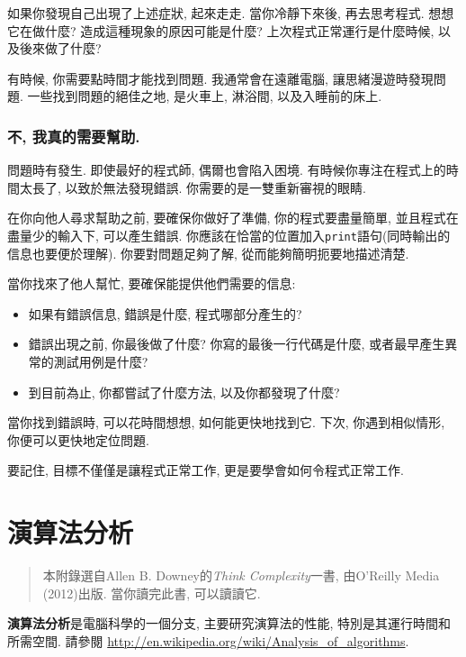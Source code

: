 \documentclass[10pt]{book}
\begin{document}
如果你發現自己出現了上述症狀, 起來走走. 
當你冷靜下來後, 再去思考程式. 
想想它在做什麼? 造成這種現象的原因可能是什麼?
上次程式正常運行是什麼時候, 以及後來做了什麼?

有時候, 你需要點時間才能找到問題. 
我通常會在遠離電腦, 讓思緒漫遊時發現問題. 
一些找到問題的絕佳之地, 是火車上, 淋浴間, 以及入睡前的床上. 


\subsection{不, 我真的需要幫助.}

問題時有發生. 即使最好的程式師, 偶爾也會陷入困境. 
有時候你專注在程式上的時間太長了, 以致於無法發現錯誤. 
你需要的是一雙重新審視的眼睛. 

在你向他人尋求幫助之前, 要確保你做好了準備, 
你的程式要盡量簡單, 並且程式在盡量少的輸入下, 可以產生錯誤. 
你應該在恰當的位置加入{\tt print}語句(同時輸出的信息也要便於理解). 
你要對問題足夠了解, 從而能夠簡明扼要地描述清楚. 

當你找來了他人幫忙, 要確保能提供他們需要的信息:

\begin{itemize}

\item 如果有錯誤信息, 錯誤是什麼, 程式哪部分產生的?

\item 錯誤出現之前, 你最後做了什麼?
你寫的最後一行代碼是什麼, 或者最早產生異常的測試用例是什麼?

\item 到目前為止, 你都嘗試了什麼方法, 以及你都發現了什麼?

\end{itemize}

當你找到錯誤時, 可以花時間想想, 如何能更快地找到它. 
下次, 你遇到相似情形, 你便可以更快地定位問題. 

要記住, 目標不僅僅是讓程式正常工作, 更是要學會如何令程式正常工作. 


\chapter{演算法分析}
\label{algorithms}

\begin{quote}
本附錄選自Allen B. Downey的{\it Think Complexity}一書, 由O'Reilly Media (2012)出版. 
當你讀完此書, 可以讀讀它. 
\end{quote}

{\bf 演算法分析}是電腦科學的一個分支, 主要研究演算法的性能, 特別是其運行時間和所需空間. 
請參閱
\url{http://en.wikipedia.org/wiki/Analysis_of_algorithms}.
 
\end{document}
